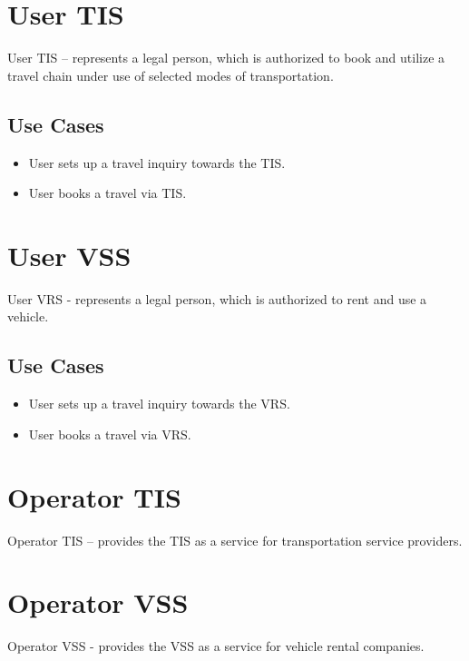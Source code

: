 \section*{User TIS}
User TIS – represents a legal person, which is authorized to book and utilize a travel chain under use of selected modes of transportation.

\subsection*{Use Cases}
\begin{itemize}
\item User sets up a travel inquiry towards the TIS.
\item User books a travel via TIS.
\end{itemize}

\section*{User VSS}
User VRS - represents a legal person, which is authorized to rent and use a vehicle.

\subsection*{Use Cases}
\begin{itemize}
\item User sets up a travel inquiry towards the VRS.
\item User books a travel via VRS.
\end{itemize}

\section*{Operator TIS}
Operator TIS – provides the TIS as a service for transportation service providers.



\section*{Operator VSS}
Operator VSS - provides the VSS as a service for vehicle rental companies.

